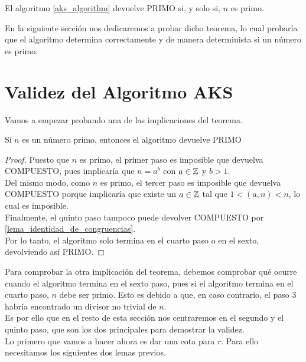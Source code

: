 \begin{teorema}\label{validez_algoritmo_aks}
	El algoritmo \autoref{aks_algorithm} devuelve PRIMO si, y solo si, $n$ es primo.
\end{teorema}

En la siguiente sección nos dedicaremos a probar dicho teorema, lo cual probaría que el algoritmo determina correctamente y de manera determinista si un número es primo.

\section{Validez del Algoritmo AKS}

Vamos a empezar probando una de las implicaciones del teorema.

\begin{lema}\label{devuelve_PRIMO_si_n_primo}
	Si $n$ es un número primo, entonces el algoritmo devuelve PRIMO
\end{lema}

\begin{proof}
	Puesto que $n$ es primo, el primer paso es imposible que devuelva COMPUESTO, pues implicaría que $n = a^b$ con $a \in \mathbb{Z}$ y $b > 1$.\\
	
	Del mismo modo, como $n$ es primo, el tercer paso es imposible que devuelva COMPUESTO porque implicaría que existe un $a \in \mathbb{Z}$ tal que $1 < (a, n) < n$, lo cual es imposible.\\
	
	Finalmente, el quinto paso tampoco puede devolver COMPUESTO por \autoref{lema_identidad_de_congruencias}.\\
	
	Por lo tanto, el algoritmo solo termina en el cuarto paso o en el sexto, devolviendo así PRIMO.
\end{proof}

Para comprobar la otra implicación del teorema, debemos comprobar qué ocurre cuando el algoritmo termina en el sexto paso, pues si el algoritmo termina en el cuarto paso, $n$ debe ser primo. Esto es debido a que, en caso contrario, el paso $3$ habría encontrado un divisor no trivial de $n$.\\

Es por ello que en el resto de esta sección nos centraremos en el segundo y el quinto paso, que son los dos principales para demostrar la validez.\\

Lo primero que vamos a hacer ahora es dar una cota para $r$. Para ello necesitamos los siguientes dos lemas previos.

